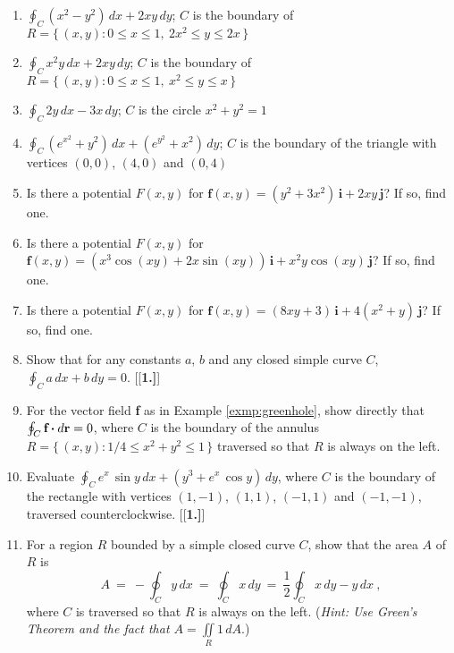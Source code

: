 \begin{enumerate}[\bfseries 1.]
 \item $\displaystyle\oint_C (x^2 - y^2 )\,dx + 2xy\,dy$; $C$ is the boundary
  of $R = \lbrace\,(x,y): 0 \le x \le 1,~2x^2 \le y \le 2x \,\rbrace$
 \item $\displaystyle\oint_C x^2 y\,dx + 2xy\,dy$; $C$ is the boundary
  of $R = \lbrace\,(x,y): 0 \le x \le 1,~x^2 \le y \le x \,\rbrace$
 \item $\displaystyle\oint_C 2y\,dx - 3x\,dy$; $C$ is the circle $x^2 + y^2 = 1$
 \item $\displaystyle\oint_C (e^{x^2} + y^2 )\,dx + (e^{y^2} + x^2 )\,dy$; $C$ is the boundary of the triangle with
  vertices $(0,0)$, $(4,0)$ and $(0,4)$
 \item Is there a potential $F(x,y)$ for $\textbf{f}(x,y) = (y^2 + 3x^2 )\,\textbf{i} + 2xy\,\textbf{j}$?
  If so, find one.
 \item Is there a potential $F(x,y)$ for $\textbf{f}(x,y) = (x^3 \cos (xy) + 2x \sin (xy))\,\textbf{i} +
  x^2 y \cos (xy)\,\textbf{j}$? If so, find one.
 \item Is there a potential $F(x,y)$ for $\textbf{f}(x,y) = (8xy+3)\,\textbf{i} +
  4(x^2 + y)\,\textbf{j}$? If so, find one.
 \item Show that for any constants $a$, $b$ and any closed simple curve $C$, $\displaystyle\oint_C a\,dx + b\,dy = 0$.
[{[\bfseries 1.]}]
 \item For the vector field \textbf{f} as in Example \ref{exmp:greenhole}, show directly that
 $\oint_{C} \textbf{f} \bm{\cdot} d\textbf{r} = 0$, where
 $C$ is the boundary of the annulus $R =\lbrace\,(x,y): 1/4 \le x^2 + y^2 \le 1\,\rbrace$ traversed so that $R$ is
 always on the left.
 \item Evaluate $\displaystyle\oint_C  e^x \,\sin y\,dx + (y^3 + e^x \,\cos y)\,dy$, where $C$ is the boundary of the
  rectangle with vertices $(1,-1)$, $(1,1)$, $(-1,1)$ and $(-1,-1)$, traversed counterclockwise.
[{[\bfseries 1.]}]
 \item For a region $R$ bounded by a simple closed curve $C$, show that the area $A$ of $R$ is
  \begin{displaymath}
   A ~=~ -\oint_C y\,dx ~=~ \oint_C x\,dy ~=~ \frac{1}{2}\oint_C x\,dy - y\,dx ~,
  \end{displaymath}
  where $C$ is traversed so that $R$ is always on the left.
  (\emph{Hint: Use Green's Theorem and the fact that $A = \iint\limits_{R} 1\,dA$}.)
\end{enumerate}
\newpage
